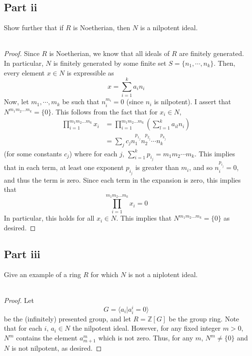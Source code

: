 \documentclass[12pt,reqno]{amsart}
\newcommand{\Z}{\mathbb{Z}}
\begin{document}
\subsection*{Part ii}
Show further that if $R$ is Noetherian, then $N$ is a nilpotent ideal.
\\
\\
\begin{proof}
    Since $R$ is Noetherian, we know that all ideals of $R$ are finitely
    generated. In particular, $N$ is finitely generated by some finite set $S =
    \{n_1,\cdots,n_k\}$. Then, every element $x\in N$ is expressible as
    \[
        x = \sum_{i=1}^ka_in_i
    \]
    Now, let $m_1,\cdots,m_k$ be such that $n_i^{m_i} = 0$ (since $n_i$ is
    nilpotent). I assert that $N^{m_1m_2\ldots m_k}=\{0\}$. This follows
    from the fact that for $x_i\in N$,
    \[
        \begin{aligned}
            \prod_{i=1}^{m_1m_2\ldots m_k}x_i 
            &= \prod_{i=1}^{m_1m_2\ldots m_k}\left( \sum_{l=1}^k a_{il}n_i
            \right)\\
        &=\sum_j c_jn_1^{p_{1_j}}n_2^{p_{2_j}}\cdots n_k^{p_{k_j}}
    \end{aligned}
    \]
    (for some constants $c_j$)
    where for each $j$, $\sum_{i=1}^kp_{i_j} = m_1m_2\cdots m_k$. This implies
    that in each term, at least one exponent $p_{i_j}$ is greater than $m_i$,
    and so $n_i^{p_{i_j}}=0$, and thus the term is zero. Since each term in the
    expansion is zero, this implies that
    \[
            \prod_{i=1}^{m_1m_2\ldots m_k}x_i =0
    \]
    In particular, this holds for all $x_i\in N$. This implies that
    $N^{m_1m_2\ldots m_k} = \{0\}$ as desired.
\end{proof}

\subsection*{Part iii}
Give an example of a ring $R$ for which $N$ is not a niplotent ideal.
\\
\\
\begin{proof}
    Let
    \[
        G = \langle a_i|a_i^i = 0\rangle
    \]
    be the (infinitely) presented group, and let $R = \Z[G]$ be the group ring.
    Note that for each $i$, $a_i\in N$ the nilpotent ideal. However, for any
    fixed integer $m>0$, $N^m$ contains the element $a_{m+1}^m$ which is not
    zero. Thus, for any $m$, $N^m\neq \{0\}$ and $N$ is not nilpotent, as
    desired.
\end{proof}
\end{document}
